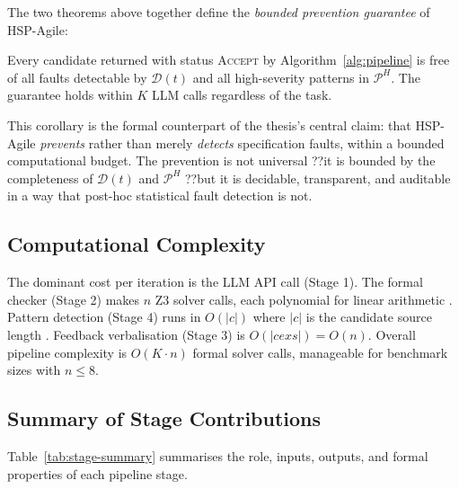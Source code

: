 The two theorems above together define the \emph{bounded prevention guarantee}
of HSP-Agile:

\begin{corollary}
\label{cor:prevention}
Every candidate returned with status \textsc{Accept} by
Algorithm~\ref{alg:pipeline} is free of all faults detectable by
$\mathcal{D}(t)$ and all high-severity patterns in $\mathcal{P}^H$.
The guarantee holds within $K$ LLM calls regardless of the task.
\end{corollary}

This corollary is the formal counterpart of the thesis's central claim: that
HSP-Agile \emph{prevents} rather than merely \emph{detects} specification
faults, within a bounded computational budget.  The prevention is not
universal ??it is bounded by the completeness of $\mathcal{D}(t)$ and
$\mathcal{P}^H$ ??but it is decidable, transparent, and auditable in a way
that post-hoc statistical fault detection is not.

\subsection{Computational Complexity}
\label{subsec:method:complexity}

The dominant cost per iteration is the LLM API call (Stage 1).
The formal checker (Stage 2) makes $n$ Z3 solver calls, each polynomial for
linear arithmetic \citep{barrett2018smt, demoura2008z3}.
Pattern detection (Stage 4) runs in $O(|c|)$ where $|c|$ is the candidate
source length \citep{cousot1977abstract}.
Feedback verbalisation (Stage 3) is $O(|\mathit{cexs}|) = O(n)$.
Overall pipeline complexity is $O(K \cdot n)$ formal solver calls, manageable
for benchmark sizes with $n \le 8$.

\subsection{Summary of Stage Contributions}
\label{subsec:method:stage-summary}

Table~\ref{tab:stage-summary} summarises the role, inputs, outputs, and
formal properties of each pipeline stage.

